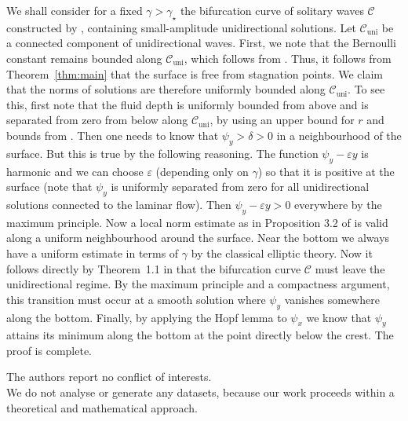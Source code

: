 \documentclass[pdflatex,sn-mathphys-num]{sn-jnl}%
\numberwithin{equation}{section}
\theoremstyle{thmstyleone}
\newcommand{\uni}{\mathrm{uni}} %
\begin{document}
We shall consider for a fixed $\gamma > \gamma_\star$ the bifurcation curve of solitary waves $\mathcal C$ constructed by \cite{Haziot2023}, containing small-amplitude unidirectional solutions. Let ${\mathcal C}_\uni$ be a connected component of unidirectional waves. First, we note that the Bernoulli constant remains bounded along $\mathcal C_\uni$, which follows from \cite{Lokharu2021}. Thus, it follows from Theorem~\ref{thm:main} that the surface is free from stagnation points. We claim that the norms of solutions are therefore uniformly bounded along $\mathcal C_\uni$. To see this, first note that the fluid depth is uniformly bounded from above and is separated from zero from below along $\mathcal C_\uni$, by using an upper bound for $r$ and bounds from \cite{Kozlov2015}. Then one needs to know that $\psi_y > \delta > 0$ in a neighbourhood of the surface. But this is true by the following reasoning. The function $\psi_y - \varepsilon y$ is harmonic and we can choose $\varepsilon$ (depending only on $\gamma$) so that it is positive at the surface (note that $\psi_y$ is uniformly separated from zero for all unidirectional solutions connected to the laminar flow). Then $\psi_y - \varepsilon y > 0$ everywhere by the maximum principle. 
%
Now a local norm estimate as in Proposition 3.2 of \cite{Kozlov2023} is valid along a uniform neighbourhood around the surface. Near the bottom we always have a uniform estimate in terms of $\gamma$ by the classical elliptic theory. Now it follows directly by Theorem~1.1 in \cite{Haziot2023} that the bifurcation curve $\mathcal C$ must leave the unidirectional regime. By the maximum principle and a compactness argument, this transition must occur at a smooth solution where $\psi_y$ vanishes somewhere along the bottom. Finally, by applying the Hopf lemma to $\psi_x$ we know that $\psi_y$ attains its minimum along the bottom at the point directly below the crest. The proof is complete.


 The authors report no conflict of interests. \\

 We do not analyse or generate any datasets, because our work proceeds within a theoretical and mathematical approach.




\end{document}
